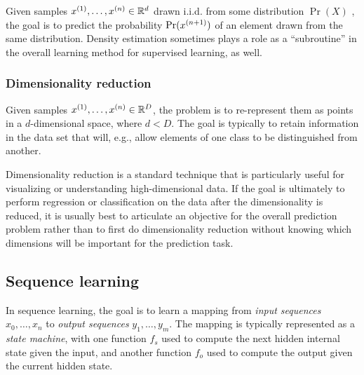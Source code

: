 Given samples $x^{(1)}, \ldots, x^{(n)} \in \mathbb{R}^d$ drawn i.i.d.
from some distribution $\Pr(X)$ , the goal is to predict the probability
$\Pr(x^{(n+1)})$ of an element drawn from the same distribution.
Density estimation sometimes plays a role as a ``subroutine'' in the
overall learning method for supervised learning, as well.

\subsubsection{Dimensionality reduction}

Given samples $x^{(1)}, \ldots, x^{(n)} \in \mathbb{R}^D$, the problem is to
re-represent them as points in a $d$-dimensional space, where $d <
  D$.  The goal is typically to retain information in the data set that
will, e.g., allow elements of one class to be distinguished from
another.

Dimensionality reduction is a standard technique that is particularly useful for
visualizing or understanding high-dimensional data.  If the goal is
ultimately to perform regression or classification on the data after
the dimensionality is reduced, it is usually best to articulate an objective
for the overall prediction problem rather than to first do
dimensionality reduction without knowing which dimensions will be
important for the prediction task.

\subsection{Sequence learning}

In sequence learning, the goal is to learn a mapping from {\em input
    sequences} $x_0, \ldots, x_n$ to {\em output sequences} $y_1,
  \ldots, y_m$.  The mapping is typically represented as a {\em state
    machine}, with one function $f_s$ used to compute the next hidden
internal state given the input, and another function $f_o$ used to
compute the output given the current hidden state.


